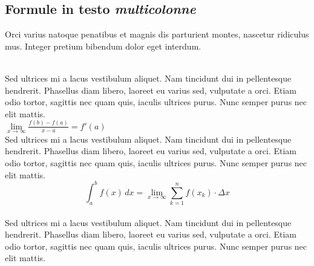 \documentclass[11pt]{article}
\begin{document}
\begin{multicols}{2}

\subsection{Formule in testo \emph{multicolonne}}
Orci varius natoque penatibus et magnis dis parturient montes, nascetur ridiculus mus. Integer pretium bibendum dolor eget interdum.\\[3mm]
\noindent
\vspace{10pt}
\\
Sed ultrices mi a lacus vestibulum aliquet. Nam tincidunt dui in pellentesque hendrerit. Phasellus diam libero, laoreet eu varius sed, vulputate a orci. Etiam odio tortor, sagittis nec quam quis, iaculis ultrices purus. Nunc semper purus nec elit mattis.\\[4mm]
$\displaystyle{\lim \limits_{x \to \infty} \frac{f(b)-f(a)}{x-a}=f'(a)}$\\[4mm]
Sed ultrices mi a lacus vestibulum aliquet. Nam tincidunt dui in pellentesque hendrerit. Phasellus diam libero, laoreet eu varius sed, vulputate a orci. Etiam odio tortor, sagittis nec quam quis, iaculis ultrices purus. Nunc semper purus nec elit mattis.\\
\begin{equation}
	\displaystyle{\int_a^b{f(x) \,dx=\lim \limits_{x \to \infty} \sum \limits_{k=1}^{n}f(x_k) \cdot \Delta x}}
\end{equation}\\
Sed ultrices mi a lacus vestibulum aliquet. Nam tincidunt dui in pellentesque hendrerit. Phasellus diam libero, laoreet eu varius sed, vulputate a orci. Etiam odio tortor, sagittis nec quam quis, iaculis ultrices purus. Nunc semper purus nec elit mattis.\\[1.5mm]
\end{multicols}
\end{document}

